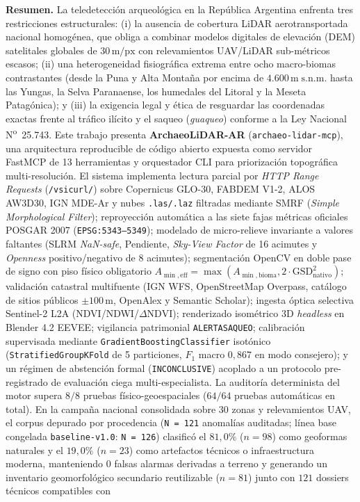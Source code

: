 \documentclass[11pt,a4paper]{article}
\DeclareRobustCommand{\_}{\ifmmode\mbox{\textunderscore}\else\textunderscore\allowbreak\fi}
\begin{document}
\vspace{6pt}
\begin{tcolorbox}[colback=slatebg,colframe=navy,boxrule=0.7pt,arc=2pt,left=8pt,right=8pt,top=6pt,bottom=6pt]
\small
\textbf{\color{navy}Resumen.}
La teledetecci\'on arqueol\'ogica en la Rep\'ublica Argentina enfrenta tres restricciones estructurales: (i) la ausencia de cobertura LiDAR aerotransportada nacional homog\'enea, que obliga a combinar modelos digitales de elevaci\'on (DEM) satelitales globales de $30\,\mathrm{m/px}$ con relevamientos UAV/LiDAR sub-m\'etricos escasos; (ii) una heterogeneidad fisiogr\'afica extrema entre ocho macro-biomas contrastantes (desde la Puna y Alta Monta\~na por encima de $4.600\,\mathrm{m\;s.n.m.}$ hasta las Yungas, la Selva Paranaense, los humedales del Litoral y la Meseta Patag\'onica); y (iii) la exigencia legal y \'etica de resguardar las coordenadas exactas frente al tr\'afico il\'icito y el saqueo (\emph{guaqueo}) conforme a la Ley Nacional N\textsuperscript{o}~25.743. Este trabajo presenta \textbf{ArchaeoLiDAR-AR} (\texttt{archaeo-lidar-mcp}), una arquitectura reproducible de c\'odigo abierto expuesta como servidor FastMCP de 13 herramientas y orquestador CLI para priorizaci\'on topogr\'afica multi-resoluci\'on. El sistema implementa lectura parcial por \emph{HTTP Range Requests} (\texttt{/vsicurl/}) sobre Copernicus GLO-30, FABDEM V1-2, ALOS AW3D30, IGN MDE-Ar y nubes \texttt{.las/.laz} filtradas mediante SMRF (\emph{Simple Morphological Filter}); reproyecci\'on autom\'atica a las siete fajas m\'etricas oficiales POSGAR 2007 (\texttt{EPSG:5343--5349}); modelado de micro-relieve invariante a valores faltantes (SLRM \emph{NaN-safe}, Pendiente, \emph{Sky-View Factor} de 16 acimutes y \emph{Openness} positivo/negativo de 8 acimutes); segmentaci\'on OpenCV en doble pase de signo con piso f\'isico obligatorio $A_{\min,\mathrm{eff}} = \max(A_{\min,\mathrm{bioma}}, 2 \cdot \mathrm{GSD}_{\mathrm{nativo}}^2)$; validaci\'on catastral multifuente (IGN WFS, OpenStreetMap Overpass, cat\'alogo de sitios p\'ublicos $\pm 100\,\mathrm{m}$, OpenAlex y Semantic Scholar); ingesta \'optica selectiva Sentinel-2 L2A (NDVI/NDWI/$\Delta\mathrm{NDVI}$); renderizado isom\'etrico 3D \emph{headless} en Blender 4.2 EEVEE; vigilancia patrimonial \texttt{ALERTA\_SAQUEO}; calibraci\'on supervisada mediante \texttt{GradientBoostingClassifier} isot\'onico (\texttt{StratifiedGroupKFold} de 5 particiones, $F_1$ macro $0{,}867$ en modo consejero); y un r\'egimen de abstenci\'on formal (\texttt{INCONCLUSIVE}) acoplado a un protocolo pre-registrado de evaluaci\'on ciega multi-especialista. La auditor\'ia determinista del motor supera $8/8$ pruebas f\'isico-geoespaciales ($64/64$ pruebas autom\'aticas en total). En la campa\~na nacional consolidada sobre $30$ zonas y relevamientos UAV, el corpus depurado por procedencia (\texttt{N = 121} anomal\'ias auditadas; l\'inea base congelada \texttt{baseline-v1.0}: \texttt{N = 126}) clasific\'o el $81{,}0\%$ ($n=98$) como geoformas naturales y el $19{,}0\%$ ($n=23$) como artefactos t\'ecnicos o infraestructura moderna, manteniendo $0$ falsas alarmas derivadas a terreno y generando un inventario geomorfol\'ogico secundario reutilizable ($n=81$) junto con $121$ dossiers t\'ecnicos compatibles con 
\end{tcolorbox}
\end{document}

